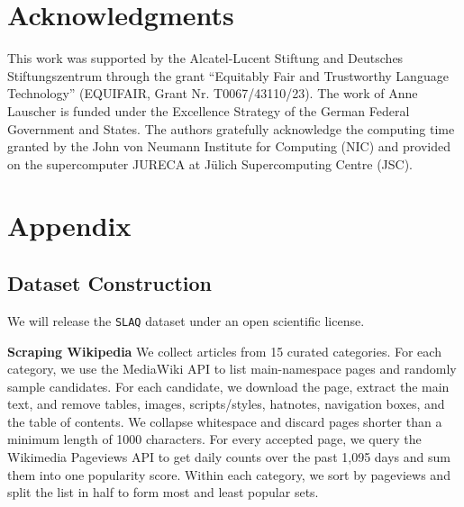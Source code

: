 \documentclass[11pt]{article}
\newcommand{\rparagraph}[1]{\vspace{1.2mm}\noindent\textbf{#1}}
\newcommand{\acrnm}{\texttt{SLAQ}\xspace}
\begin{document}
\section{Acknowledgments}
This work was supported by the Alcatel-Lucent Stiftung and Deutsches Stiftungszentrum through the grant “Equitably Fair and Trustworthy Language Technology” (EQUIFAIR, Grant Nr.
T0067/43110/23). The work of Anne Lauscher is funded under the Excellence Strategy of the German Federal Government and States. The authors gratefully acknowledge the computing time granted by the John von Neumann Institute for Computing (NIC) and provided on the supercomputer JURECA \citep{JURECA} at Jülich Supercomputing Centre (JSC).






\appendix

\section{Appendix}\label{sec:appendix}

\subsection{Dataset Construction} 
\label{subsec:appendix-dataset}

We will release the \acrnm dataset under an open scientific license. 

\rparagraph{Scraping Wikipedia} We collect articles from 15 curated categories. For each category, we use the MediaWiki API to list main-namespace pages and randomly sample candidates. For each candidate, we download the page, extract the main text, and remove tables, images, scripts/styles, hatnotes, navigation boxes, and the table of contents. We collapse whitespace and discard pages shorter than a minimum length of 1000 characters. For every accepted page, we query the Wikimedia Pageviews API to get daily counts over the past 1,095 days and sum them into one popularity score. Within each category, we sort by pageviews and split the list in half to form most and least popular sets.
\end{document}
